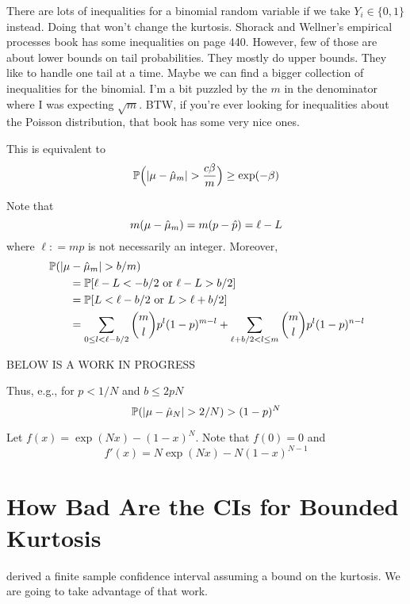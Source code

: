 \documentclass{amsart}
\newcommand{\art}[1]{{\color{blue}#1}}
\begin{document}
\art{There are lots of inequalities for a binomial random variable if we take $Y_i\in\{0,1\}$ instead. Doing that won't change the kurtosis. Shorack and Wellner's empirical processes book has some inequalities on page 440. However, few of those are about lower bounds on tail probabilities. They mostly do upper bounds. They like to handle one tail at a time.  Maybe we can find a bigger collection of inequalities for the binomial.  I'm a bit puzzled by the $m$ in the denominator where I was expecting $\sqrt{m}$. BTW, if you're ever looking for inequalities about the Poisson distribution, that book has some very nice ones. }

This is equivalent to
\[
\operatorname{\mathbb{P}}\Bigl(\lvert \mu - \hat{\mu}_m \rvert > \frac{c \beta}{m} \Bigr) \ge \exp(-\beta)
\]

Note that 
\[
m(\mu - \hat{\mu}_m)  = m(p - \hat{p}) = \ell - L
\]
where $\ell : = mp$ is not necessarily an integer.
Moreover, 
\begin{align*}
    \MoveEqLeft \Prob(\lvert \mu - \hmu_m \rvert > b/m) \\
    &= \Prob[ \ell - L < -b/2 \text{ or } \ell - L >  b/2] \\
    &= \Prob[ L < \ell - b/2 \text{ or } L > \ell + b/2] \\
    & = \sum_{0 \le l  < \ell - b/2}  \binom{m}{l} p^{l}(1-p)^{m-l} 
    + \sum_{\ell + b/2 < l \le m}  \binom{m}{l} p^l(1-p)^{n-l}
\end{align*}

\bigskip

BELOW IS A WORK IN PROGRESS


Thus, e.g., for $p < 1/N$ and $b \le 2pN $
\[
\operatorname{\mathbb{P}}(\lvert \mu - \hat{\mu}_N \rvert > 2/N) 
> (1-p)^{N} 
\]

Let $f(x) = \exp(Nx) - (1-x)^N$.  Note that $f(0) =0$ and 
\[
f'(x) = N \exp(Nx) - N(1-x)^{N-1}
\]

\section{How Bad Are the CIs for Bounded Kurtosis}

\cite{HicEtal14a} derived a finite sample confidence interval assuming a bound on the kurtosis.  We are going to take advantage of that work.






\end{document}
